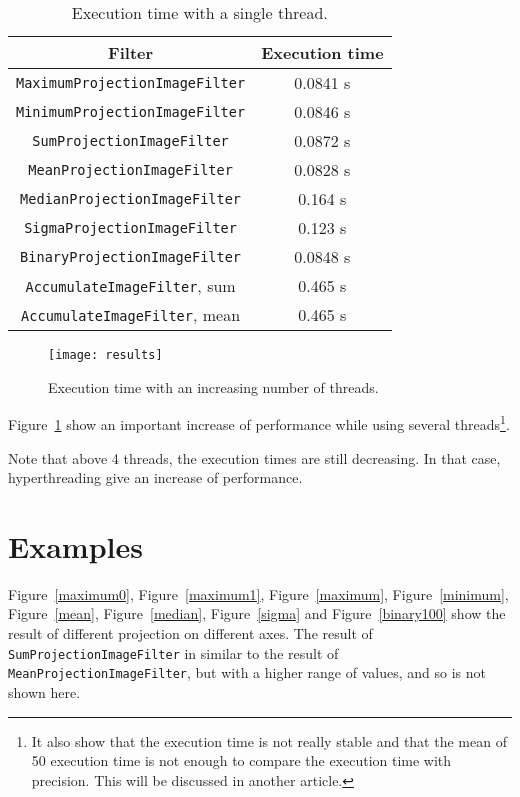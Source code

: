 \documentclass{InsightArticle}
\begin{document}
\begin{table}[htbp]
\centering
\begin{tabular}{cc}
\hline
Filter & Execution time \\
\hline
\hline
\verb$MaximumProjectionImageFilter$ & 0.0841 s \\
\verb$MinimumProjectionImageFilter$  & 0.0846 s\\
\verb$SumProjectionImageFilter$  & 0.0872 s\\
\verb$MeanProjectionImageFilter$  & 0.0828 s\\
\verb$MedianProjectionImageFilter$  & 0.164 s\\
\verb$SigmaProjectionImageFilter$  & 0.123 s\\
\verb$BinaryProjectionImageFilter$  & 0.0848 s\\
\verb$AccumulateImageFilter$, sum  & 0.465 s\\
\verb$AccumulateImageFilter$, mean  & 0.465 s\\
\hline
\end{tabular}
\caption{Execution time with a single thread.\label{perf}}
\end{table}

\begin{figure}[htbp]
\centering
\texttt{[image: results]}
\caption{Execution time with an increasing number of threads.\label{results}}
\end{figure}

Figure~\ref{results} show an important increase of performance while using several
threads\footnote{It also show that the execution time is not really stable
and that the mean of 50 execution time is not enough to compare the execution
time with precision. This will be discussed in another article.}.

Note that above 4 threads, the execution times are still decreasing. In that case,
hyperthreading give an increase of performance.

\section{Examples}
Figure~\ref{maximum0}, Figure~\ref{maximum1}, Figure~\ref{maximum},
Figure~\ref{minimum}, Figure~\ref{mean}, Figure~\ref{median},
Figure~\ref{sigma} and Figure~\ref{binary100} show the result
of different projection on different axes. The result of
\verb$SumProjectionImageFilter$ in similar to the result of \verb$MeanProjectionImageFilter$,
but with a higher range of values, and so is not shown here.
\end{document}
